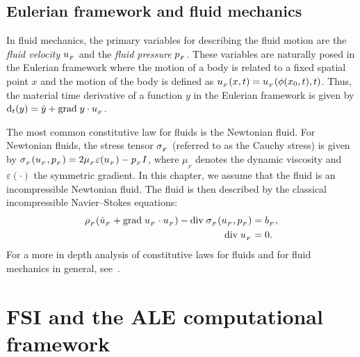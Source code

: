 \subsection{Eulerian framework and fluid mechanics}
\label{selim:sec:fluid}

In fluid mechanics, the primary variables for describing the fluid
motion are the \emph{fluid velocity} $u_{_{F}}$ and the \emph{fluid pressure}
$p_{_{F}}$. These variables are naturally posed in the Eulerian framework
where the motion of a body is related to a fixed spatial point $x$ and the
motion of the body is defined as $u_{_{F}}(x,t) = u_{_{F}}(\phi(x_0,t),t)$. Thus,
the material time derivative of a function $y$ in the Eulerian framework
is given by $\textrm{d}_t(y) = \dot{y} + \textrm{grad}\;y\cdot u_{_{F}}$.

The most common constitutive law for fluids is the Newtonian fluid.
For Newtonian fluids, the stress tensor $\sigma_{_{F}}$ (referred to as the
Cauchy stress) is given by $\sigma_{_{F}}(u_{_{F}}, p_{_{F}}) = 2\mu_{_{F}}\varepsilon (u_{_{F}}) -
p_{_{F}} I$, where $\mu_{_{F}}$ denotes the dynamic viscosity and
$\varepsilon(\cdot)$ the symmetric gradient. In this chapter, we
assume that the fluid is an incompressible Newtonian fluid. The fluid
is then described by the classical incompressible Navier--Stokes
equations:
\begin{align}
  \label{selim:eq:NSmom}
      \rho_{_{F}}(\dot{u}_{_{F}} + \textrm{grad}\;u_{_{F}}\cdot u_{_{F}})- \textrm{div}\;
      \sigma_{_{F}}(u_{_{F}}, p_{_{F}}) &= b_{_{F}},
\\
  \label{selim:eq:NScon}
      \textrm{div}\; u_{_{F}} &= 0.
\end{align}
For a more in depth analysis of constitutive laws
for fluids and for fluid mechanics in general,
see~\citet{Batchelor1967,Panton1984,WeltyWicksWilson2001}.
\section{FSI and the ALE computational framework}
\label{selim:sec:ale}

